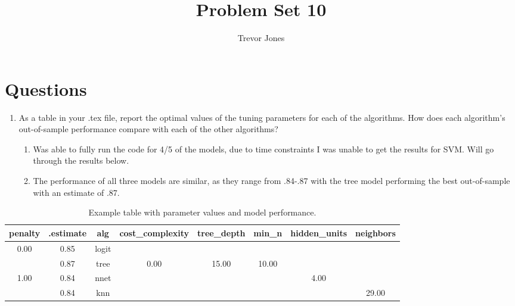 \documentclass{article}
\title{Problem Set 10}
\author{Trevor Jones}
\begin{document}
\maketitle

\section{Questions}
\begin{enumerate}
    \item As a table in your .tex file, report the optimal values of the tuning parameters for each of the algorithms. How does each algorithm’s out-of-sample performance compare with each of the other algorithms?
    \begin{enumerate}
        \item Was able to fully run the code for 4/5 of the models, due to time constraints I was unable to get the results for SVM. Will go through the results below. 
        \item The performance of all three models are similar, as they range from .84-.87 with the tree model performing the best out-of-sample with an estimate of .87. 
    \end{enumerate}
\end{enumerate}

\begin{table}[h!]
  \centering
  \begin{tabular}{|c|c|c|c|c|c|c|c|}
    \hline
    penalty & .estimate & alg & cost\_complexity & tree\_depth & min\_n & hidden\_units & neighbors \\
    \hline
    0.00 & 0.85 & logit & & & & & \\
    & 0.87 & tree & 0.00 & 15.00 & 10.00 & & \\
    1.00 & 0.84 & nnet & & & & 4.00 & \\
    & 0.84 & knn & & & & & 29.00 \\
    \hline
  \end{tabular}
  \caption{Example table with parameter values and model performance.}
  \label{tab:example_table}
\end{table}


\pagebreak
\end{document}
